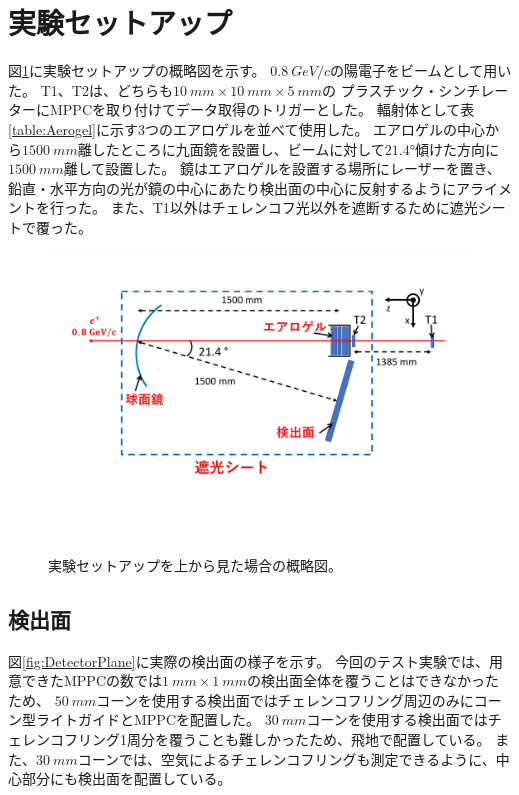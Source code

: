 \section{実験セットアップ}
図\ref{fig:ELPHSetup}に実験セットアップの概略図を示す。
$\SI{0.8}{GeV/c}$の陽電子をビームとして用いた。
T1、T2は、どちらも$\SI{10}{mm}\times\SI{10}{mm}\times\SI{5}{mm}$の
プラスチック・シンチレーターにMPPCを取り付けてデータ取得のトリガーとした。
輻射体として表\ref{table:Aerogel}に示す3つのエアロゲルを並べて使用した。
エアロゲルの中心から$\SI{1500}{mm}$離したところに九面鏡を設置し、ビームに対して$\ang{21.4}$傾けた方向に$\SI{1500}{mm}$離して設置した。
鏡はエアロゲルを設置する場所にレーザーを置き、鉛直・水平方向の光が鏡の中心にあたり検出面の中心に反射するようにアライメントを行った。
また、T1以外はチェレンコフ光以外を遮断するために遮光シートで覆った。
\begin{figure}
  \centering
  \includegraphics[width=15cm]{images/chapter3/ELPHSetup.pdf}
  \caption{実験セットアップを上から見た場合の概略図。}
  \label{fig:ELPHSetup}
\end{figure}

\subsection{検出面}
図\ref{fig:DetectorPlane}に実際の検出面の様子を示す。
今回のテスト実験では、用意できたMPPCの数では$\SI{1}{mm}\times\SI{1}{mm}$の検出面全体を覆うことはできなかったため、
$\SI{50}{mm}$コーンを使用する検出面ではチェレンコフリング周辺のみにコーン型ライトガイドとMPPCを配置した。
$\SI{30}{mm}$コーンを使用する検出面ではチェレンコフリング1周分を覆うことも難しかったため、飛地で配置している。
また、$\SI{30}{mm}$コーンでは、空気によるチェレンコフリングも測定できるように、中心部分にも検出面を配置している。

